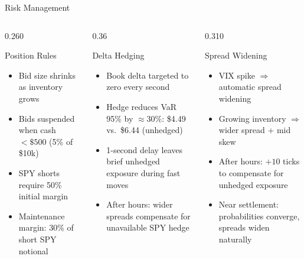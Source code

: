 \documentclass[aspectratio=169]{beamer}
\begin{document}
\begin{frame}[shrink=5]{Risk Management}
  \begin{columns}[T,onlytextwidth]
    \begin{column}{0.260\textwidth}
      \begin{block}{Position Rules}
        \begin{itemize}\footnotesize
          \item Bid size shrinks as inventory grows
          \item Bids suspended when cash $<\$500$ (5\% of \$10k)
          \item SPY shorts require 50\% initial margin
          \item Maintenance margin: 30\% of short SPY notional
        \end{itemize}
      \end{block}
    \end{column}
    \begin{column}{0.36\textwidth}
      \begin{block}{Delta Hedging}
        \begin{itemize}\footnotesize
          \item Book delta targeted to zero every second
          \item Hedge reduces VaR 95\% by ${\approx}30\%$: \$4.49 vs.\ \$6.44 (unhedged)
          \item 1-second delay leaves brief unhedged exposure during fast moves
          \item After hours: wider spreads compensate for unavailable SPY hedge
        \end{itemize}
      \end{block}
    \end{column}
    \begin{column}{0.310\textwidth}
      \begin{block}{Spread Widening}
        \begin{itemize}\footnotesize
          \item VIX spike $\Rightarrow$ automatic spread widening
          \item Growing inventory $\Rightarrow$ wider spread + mid skew
          \item After hours: $+10$ ticks to compensate for unhedged exposure
          \item Near settlement: probabilities converge, spreads widen naturally
        \end{itemize}
      \end{block}
    \end{column}
  \end{columns}
\end{frame}
\end{document}
